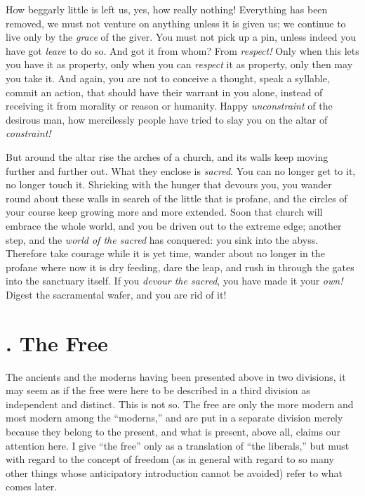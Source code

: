 How beggarly little is left us, yes, how really nothing! Everything has been 
removed, we must not venture on anything unless it is given us; we continue to 
live only by the \textit{grace} of the giver. You must not pick up a pin, 
unless indeed you have got \textit{leave} to do so. And got it from whom? From 
\textit{respect!} Only when this lets you have it as property, only when you 
can \textit{respect} it as property, only then may you take it. And again, you 
are not to conceive a thought, speak a syllable, commit an action, that should 
have their warrant in you alone, instead of receiving it from morality or 
reason or humanity. Happy \textit{unconstraint} of the desirous man, how 
mercilessly people have tried to slay you on the altar of \textit{constraint!}

But around the altar rise the arches of a church, and its walls keep moving 
further and further out. What they enclose is \textit{sacred}. You can no 
longer get to it, no longer touch it. Shrieking with the hunger that devours 
you, you wander round about these walls in search of the little that is 
profane, and the circles of your course keep growing more and more extended. 
Soon that church will embrace the whole world, and you be driven out to the 
extreme edge; another step, and the \textit{world of the sacred} has 
conquered: you sink into the abyss. Therefore take courage while it is yet 
time, wander about no longer in the profane where now it is dry feeding, dare 
the leap, and rush in through the gates into the sanctuary itself. If you 
\textit{devour the sacred}, you have made it your \textit{own!} Digest the 
sacramental wafer, and you are rid of it!

\section[3. The Free]{. The Free}

The ancients and the moderns having been presented above in two divisions, it 
may seem as if the free were here to be described in a third division as 
independent and distinct. This is not so. The free are only the more modern 
and most modern among the ``moderns,'' and are put in a separate division 
merely because they belong to the present, and what is present, above all, 
claims our attention here. I give ``the free'' only as a translation of 
``the liberals,'' but must with regard to the concept of freedom (as in 
general with regard to so many other things whose anticipatory introduction 
cannot be avoided) refer to what comes later.

